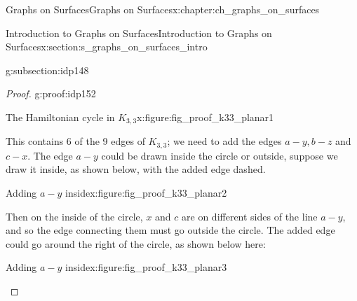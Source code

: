 \documentclass[oneside,10pt,]{book}
\numberwithin{equation}{section}
\begin{document}
\begin{chapterptx}{Graphs on Surfaces}{}{Graphs on Surfaces}{}{}{x:chapter:ch_graphs_on_surfaces}
\begin{sectionptx}{Introduction to Graphs on Surfaces}{}{Introduction to Graphs on Surfaces}{}{}{x:section:s_graphs_on_surfaces_intro}
\begin{subsectionptx}{}{}{}{}{}{g:subsection:idp148}
\begin{proof}{}{g:proof:idp152}
\begin{figureptx}{The Hamiltonian cycle in \(K_{3,3}\)}{x:figure:fig_proof_k33_planar1}{}
\begin{image}{0.15}{0.7}{0.15}%
%
\end{image}%
\tcblower
\end{figureptx}%
This contains 6 of the 9 edges of \(K_{3,3}\); we need to add the edges \(a-y, b-z\) and \(c-x\).  The edge \(a-y\) could be drawn inside the circle or outside, suppose we draw it inside, as shown below, with the added edge dashed.%
\begin{figureptx}{Adding \(a-y\) inside}{x:figure:fig_proof_k33_planar2}{}%
\begin{image}{0.15}{0.7}{0.15}%
%
\end{image}%
\tcblower
\end{figureptx}%
Then on the inside of the circle, \(x\) and \(c\) are on different sides of the line \(a-y\), and so the edge connecting them must go outside the circle.  The added edge could go around the right of the circle, as shown below here:%
\begin{figureptx}{Adding \(a-y\) inside}{x:figure:fig_proof_k33_planar3}{}%
\begin{image}{0.15}{0.7}{0.15}%
\end{image}
\end{figureptx}
\end{proof}
\end{subsectionptx}
\end{sectionptx}
\end{chapterptx}
\end{document}
